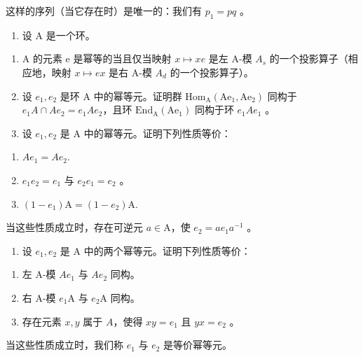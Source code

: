 这样的序列（当它存在时）是唯一的：我们有 \(p_{1} = pq\) 。

\begin{enumerate}
\def\labelenumi{\arabic{enumi})}
\setcounter{enumi}{4}
\tightlist
\item
  设 \(\mathrm{A}\) 是一个环。
\end{enumerate}

\begin{enumerate}
\def\labelenumi{\alph{enumi})}
\item
  A 的元素 e 是幂等的当且仅当映射 \(x \mapsto xe\) 是左 A-模 \(A_{s}\) 的一个投影算子（相应地，映射 \(x \mapsto ex\) 是右 A-模 \(A_{d}\) 的一个投影算子）。
\item
  设 \(e_{1}, e_{2}\) 是环 A 中的幂等元。证明群 \(\mathrm{Hom}_{\mathrm{A}}(\mathrm{Ae}_{1}, \mathrm{Ae}_{2})\) 同构于 \(e_{1}A \cap Ae_{2} = e_{1}Ae_{2}\)，且环 \(\mathrm{End}_{\mathrm{A}}(\mathrm{Ae}_{1})\) 同构于环 \(e_{1}Ae_{1}\) 。
\item
  设 \(e_1, e_2\) 是 A 中的幂等元。证明下列性质等价：
\end{enumerate}

\begin{enumerate}
\def\labelenumi{(\roman{enumi})}
\item
  \(Ae_{1} = Ae_{2}.\)
\item
  \(e_{1}e_{2}=e_{1}\) 与 \(e_{2}e_{1}=e_{2}\) 。
\item
  \((1 - e_{1})\mathrm{A} = (1 - e_{2})\mathrm{A}.\)
\end{enumerate}

当这些性质成立时，存在可逆元 \(a \in \mathrm{A}\)，使 \(e_2 = ae_1a^{-1}\) 。

\begin{enumerate}
\def\labelenumi{\alph{enumi})}
\setcounter{enumi}{3}
\tightlist
\item
  设 \(e_{1}, e_{2}\) 是 A 中的两个幂等元。证明下列性质等价：
\end{enumerate}

\begin{enumerate}
\def\labelenumi{(\roman{enumi})}
\item
  左 A-模 \(Ae_{1}\) 与 \(Ae_{2}\) 同构。
\item
  右 A-模 \(e_1\mathrm{A}\) 与 \(e_2\mathrm{A}\) 同构。
\item
  存在元素 \(x, y\) 属于 \(A\)，使得 \(xy = e_1\) 且 \(yx = e_2\) 。
\end{enumerate}

当这些性质成立时，我们称 \(e_{1}\) 与 \(e_{2}\) 是等价幂等元。

